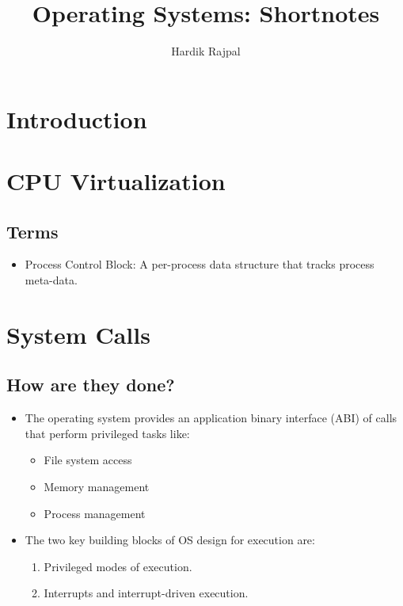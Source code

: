 \documentclass[10pt]{report}
\title{Operating Systems: Shortnotes}
\author{Hardik Rajpal}
\begin{document}
\maketitle
\tableofcontents
\pagebreak
\chapter{Introduction}
\chapter{CPU Virtualization}
\section*{Terms}
\begin{itemize}
\item Process Control Block: A per-process data structure that tracks process meta-data.
\end{itemize}
\chapter{System Calls}
\section{How are they done?}
\begin{itemize}
\item The operating system provides an application binary interface (ABI) of calls that perform privileged tasks like:
\begin{itemize}
    \item File system access
    \item Memory management
    \item Process management
\end{itemize}
\item The two key building blocks of OS design for execution are:
\begin{enumerate}
    \item Privileged modes of execution.
    \item Interrupts and interrupt-driven execution.
\end{enumerate}
\end{itemize}
\end{document}
